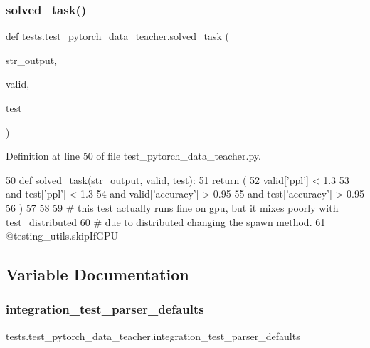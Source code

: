 \subsubsection{\texorpdfstring{solved\+\_\+task()}{solved\_task()}}
{\footnotesize\ttfamily def tests.\+test\+\_\+pytorch\+\_\+data\+\_\+teacher.\+solved\+\_\+task (\begin{DoxyParamCaption}\item[{}]{str\+\_\+output,  }\item[{}]{valid,  }\item[{}]{test }\end{DoxyParamCaption})}



Definition at line 50 of file test\+\_\+pytorch\+\_\+data\+\_\+teacher.\+py.


\begin{DoxyCode}
50 \textcolor{keyword}{def }\hyperlink{namespacetests_1_1test__pytorch__data__teacher_a5511223c74b5eca00f42d68488ea101e}{solved\_task}(str\_output, valid, test):
51     \textcolor{keywordflow}{return} (
52         valid[\textcolor{stringliteral}{'ppl'}] < 1.3
53         \textcolor{keywordflow}{and} test[\textcolor{stringliteral}{'ppl'}] < 1.3
54         \textcolor{keywordflow}{and} valid[\textcolor{stringliteral}{'accuracy'}] > 0.95
55         \textcolor{keywordflow}{and} test[\textcolor{stringliteral}{'accuracy'}] > 0.95
56     )
57 
58 
59 \textcolor{comment}{# this test actually runs fine on gpu, but it mixes poorly with test\_distributed}
60 \textcolor{comment}{# due to distributed changing the spawn method.}
61 @testing\_utils.skipIfGPU
\end{DoxyCode}


\subsection{Variable Documentation}
\mbox{\label{namespacetests_1_1test__pytorch__data__teacher_a59a58faba6f0e5a612f333fd67c5611c}} 
\subsubsection{\texorpdfstring{integration\+\_\+test\+\_\+parser\+\_\+defaults}{integration\_test\_parser\_defaults}}
{\footnotesize\ttfamily tests.\+test\+\_\+pytorch\+\_\+data\+\_\+teacher.\+integration\+\_\+test\+\_\+parser\+\_\+defaults}



